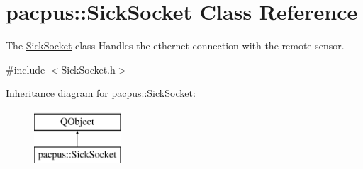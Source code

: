 \hypertarget{classpacpus_1_1SickSocket}{\section{pacpus\-:\-:Sick\-Socket Class Reference}
\label{classpacpus_1_1SickSocket}
}


The \hyperlink{classpacpus_1_1SickSocket}{Sick\-Socket} class Handles the ethernet connection with the remote sensor.  




{\ttfamily \#include $<$Sick\-Socket.\-h$>$}

Inheritance diagram for pacpus\-:\-:Sick\-Socket\-:\begin{figure}[H]
\begin{center}
\leavevmode
\includegraphics[height=2.000000cm]{classpacpus_1_1SickSocket}
\end{center}
\end{figure}
